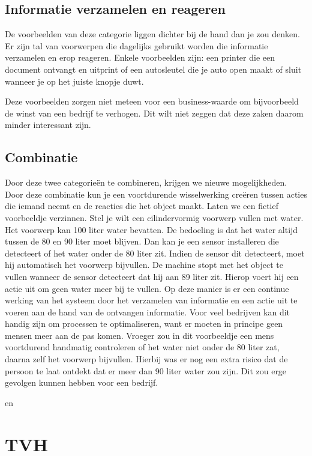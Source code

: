 \subsection{Informatie verzamelen en reageren}
De voorbeelden van deze categorie liggen dichter bij de hand dan je zou denken. Er zijn tal van voorwerpen die dagelijks gebruikt worden die informatie verzamelen en erop reageren. Enkele voorbeelden zijn: een printer die een document ontvangt en uitprint of een autosleutel die je auto open maakt of sluit wanneer je op het juiste knopje duwt.

Deze voorbeelden zorgen niet meteen voor een business-waarde om bijvoorbeeld de winst van een bedrijf te verhogen. Dit wilt niet zeggen dat deze zaken daarom minder interessant zijn.

\subsection{Combinatie}
Door deze twee categorieën te combineren, krijgen we nieuwe mogelijkheden. Door deze combinatie kun je een voortdurende wisselwerking creëren tussen acties die iemand neemt en de reacties die het object maakt. Laten we een fictief voorbeeldje verzinnen. Stel je wilt een cilindervormig voorwerp vullen met water. Het voorwerp kan 100 liter water bevatten. De bedoeling is dat het water altijd tussen de 80 en 90 liter moet blijven. Dan kan je een sensor installeren die detecteert of het water onder de 80 liter zit. Indien de sensor dit detecteert, moet hij automatisch het voorwerp bijvullen. De machine stopt met het object te vullen wanneer de sensor detecteert dat hij aan 89 liter zit. Hierop voert hij een actie uit om geen water meer bij te vullen. Op deze manier is er een continue werking van het systeem door het verzamelen van informatie en een actie uit te voeren aan de hand van de ontvangen informatie. Voor veel bedrijven kan dit handig zijn om processen te optimaliseren, want er moeten in principe geen mensen meer aan de pas komen. Vroeger zou in dit voorbeeldje een mens voortdurend handmatig controleren of het water niet onder de 80 liter zat, daarna zelf het voorwerp bijvullen. Hierbij was er nog een extra risico dat de persoon te laat ontdekt dat er meer dan 90 liter water zou zijn. Dit zou erge gevolgen kunnen hebben voor een bedrijf.

\autocite{McClelland2019} en \autocite{i-scoop2019}

\section{TVH}

